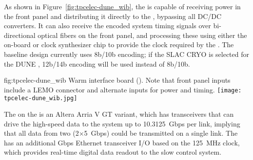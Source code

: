 As shown in Figure~\ref{fig:tpcelec-dune_wib}, the  is capable of receiving  power in the front panel and distributing it directly to the , bypassing all DC/DC converters.
It can also receive the encoded system timing signals over bi-directional optical
fibers on the front panel, and processing these using either
the on-board  or clock synthesizer chip to provide the clock required by the .
The baseline  design currently uses 8b/10b encoding; if the SLAC CRYO  is selected for
the DUNE , 12b/14b encoding will be used instead of 8b/10b.

\begin{dunefigure}
{fig:tpcelec-dune_wib}
{Warm interface board (). Note that front panel inputs include a LEMO connector and alternate inputs for  power and timing.}
\texttt{[image: tpcelec-dune\_wib.jpg]}
\end{dunefigure}

The  on the   is an Altera Arria V GT variant, which has
transceivers that can drive the high-speed data to the  system up to
10.3125~Gbps per link, implying that all data from
two  (2$\times$5~Gbps) could be transmitted on a single link.
The  has an additional Gbps Ethernet transceiver I/O based on the \SI{125}{MHz} clock, which 
provides real-time digital data readout to the slow control system.

